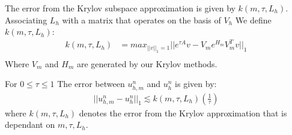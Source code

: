 \begin{definition}
    The error from the Krylov subspace approximation is given by $k(m,\tau, L_h)$.
    Associating $L_h$ with a matrix that operates on the basis of $V_h$
    We define $k(m,\tau, L_h)$:
    \begin{align*}
        k(m,\tau, L_h) &= max_{||v||_1=1}||e^{\tau A}v - V_m e^{H_m}V^T_mv||_1\\
    \end{align*}
    Where $V_m$ and $H_m$ are generated by our Krylov methods.
\end{definition}
\begin{lemma}\label{lemma:krylovbound}
    For $0\leq \tau \leq 1$
    The error between $u_{h,m}^n$ and $u_{h}^n$ is given by:
    \begin{align*}
        ||u_{h,m}^n - u_{h}^n||_1 \lesssim k(m,\tau, L_h)(\frac{1}{\tau})
    \end{align*}
    where $k(m,\tau,L_h)$ denotes the error from the Krylov approximation that is dependant on $m, \tau, L_h$.
\end{lemma}
